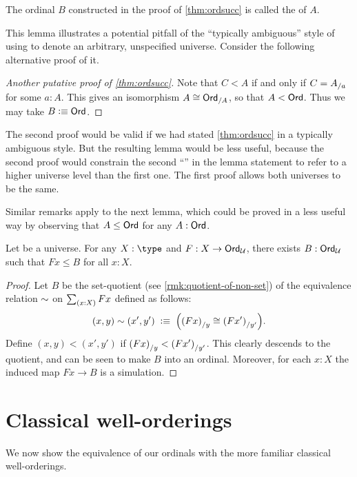 The ordinal $B$ constructed in the proof of \cref{thm:ordsucc} is called the  of $A$.

This lemma illustrates a potential pitfall of the ``typically ambiguous'' style of using \UU to denote an arbitrary, unspecified universe.
Consider the following alternative proof of it.

\begin{proof}[Another putative proof of \cref{thm:ordsucc}]
  Note that $C<A$ if and only if $C={A}_{/a}$ for some $a:A$.
  This gives an isomorphism $A \cong {\ensuremath{\mathsf{Ord}}}_{/A}$, so that $A<\mathsf{Ord}$.
  Thus we may take $B\vcentcolon\equiv\mathsf{Ord}$.
\end{proof}

The second proof would be valid if we had stated \cref{thm:ordsucc} in a typically ambiguous style.
But the resulting lemma would be less useful, because the second proof would constrain the second ``\ord'' in the lemma statement to refer to a higher universe level than the first one.
The first proof allows both universes to be the same.

Similar remarks apply to the next lemma, which could be proved in a less useful way by observing that $A\le \mathsf{Ord}$ for any $A:\mathsf{Ord}$.

\begin{lem}\label{thm:ordunion}
  Let \bbU be a universe.
  For any $X:\type$ and $F:X\to \mathsf{Ord}_\mathcal{U}$, there exists $B:\mathsf{Ord}_\mathcal{U}$ such that $Fx\le B$ for all $x:X$.
\end{lem}
\begin{proof}
  Let $B$ be the set-quotient (see \cref{rmk:quotient-of-non-set}) of the equivalence relation $\sim$ on $\sm{x:X} Fx$ defined as follows:
  \[ (x,y) \sim (x',y')
  \;\vcentcolon\equiv\;
  \Big({(Fx)}_{/y} \cong {(Fx')}_{/y'}\Big).
  \]
  Define $(x,y)<(x',y')$ if ${(Fx)}_{/y} < {(Fx')}_{/y'}$.
  This clearly descends to the quotient, and can be seen to make $B$ into an ordinal.
  Moreover, for each $x:X$ the induced map $Fx\to B$ is a simulation.
\end{proof}



\section{Classical well-orderings}
\label{sec:wellorderings}

%
We now show the equivalence of our ordinals with the more familiar classical well-orderings.

